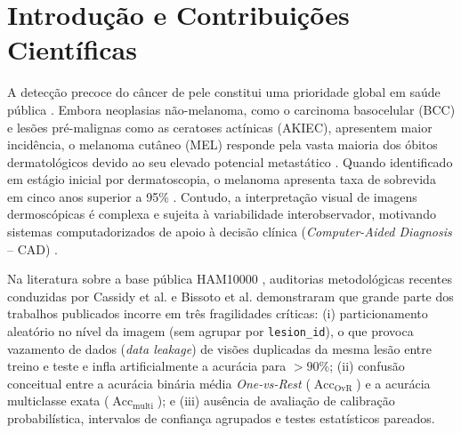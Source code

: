\documentclass[12pt,a4paper]{article}
\begin{document}
\begin{abstract}
\noindent\textbf{Conclusão:} Sob protocolo estrito sem vazamento por lesão, a fusão multimodal com a EfficientNetV2B0 oferece desempenho preditivo e eficiência computacional superiores ($6,10 \times 10^6$ parâmetros totais). A auditoria dos falsos negativos de melanoma, mapas Grad-CAM e testes de perturbação fotométrica fundamentam o potencial de rastreamento do método e delimitam os requisitos para futura validação clínica multicêntrica.
\end{abstract}

\section{Introdução e Contribuições Científicas}
A detecção precoce do câncer de pele constitui uma prioridade global em saúde pública \cite{sung2021, siegel2024}. Embora neoplasias não-melanoma, como o carcinoma basocelular (BCC) e lesões pré-malignas como as ceratoses actínicas (AKIEC), apresentem maior incidência, o melanoma cutâneo (MEL) responde pela vasta maioria dos óbitos dermatológicos devido ao seu elevado potencial metastático \cite{rigel2010}. Quando identificado em estágio inicial por dermatoscopia, o melanoma apresenta taxa de sobrevida em cinco anos superior a 95\% \cite{tschandl2018}. Contudo, a interpretação visual de imagens dermoscópicas é complexa e sujeita à variabilidade interobservador, motivando sistemas computadorizados de apoio à decisão clínica (\textit{Computer-Aided Diagnosis} -- CAD) \cite{esteva2017, haenssle2018}.

Na literatura sobre a base pública HAM10000 \cite{tschandl2018}, auditorias metodológicas recentes conduzidas por Cassidy et al. \cite{cassidy2022} e Bissoto et al. \cite{bissoto2020} demonstraram que grande parte dos trabalhos publicados incorre em três fragilidades críticas: (i) particionamento aleatório no nível da imagem (sem agrupar por \texttt{lesion\_id}), o que provoca vazamento de dados (\textit{data leakage}) de visões duplicadas da mesma lesão entre treino e teste e infla artificialmente a acurácia para $>90\%$; (ii) confusão conceitual entre a acurácia binária média \textit{One-vs-Rest} ($\operatorname{Acc}_{\text{OvR}}$) e a acurácia multiclasse exata ($\operatorname{Acc}_{\text{multi}}$); e (iii) ausência de avaliação de calibração probabilística, intervalos de confiança agrupados e testes estatísticos pareados.
\end{document}

